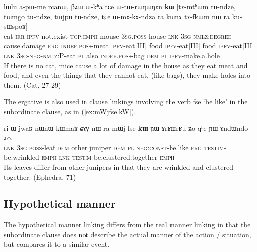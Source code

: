 \documentclass[oldfontcommands,oneside,a4paper,11pt]{article}
\newcommand{\ipa}[1]{{\phon \mbox{#1}}} %
\newcommand{\refb}[1]{(\ref{#1})}
\begin{document}
\begin{exe}
\ex \label{ex:WtWrWNWNAn}
\gll
\ipa{lɯlu}         	\ipa{a-pɯ-me}         	\ipa{rcanɯ,}         	\ipa{βʑɯ}         	\ipa{ɯ-kʰa}         	\ipa{tɕe}         	\ipa{ɯ-tɯ-rɯŋɯŋɤn}         	\ipa{\textbf{kɯ}}          [\ipa{tɤ-mtʰɯm}         	\ipa{tu-ndze,}         	\ipa{tɯmgo}         	\ipa{tu-ndze,}         	\ipa{tɯjpu}         	\ipa{tu-ndze,}         \ipa{tɕe}         	\ipa{ɯ-mɤ-kɤ-ndza}         	\ipa{ra}         	\ipa{kɯnɤ}         	\ipa{tɤ-fkɯm}         	\ipa{nɯ} \ipa{ra}         	\ipa{ku-sɯspoʁ}]         \\
cat \textsc{irr-ipfv}-not.exist \textsc{top:emph} mouse \textsc{3sg.poss}-house \textsc{lnk} \textsc{3sg-nmlz:degree}-cause.damage \textsc{erg} \textsc{indef.poss}-meat \textsc{ipfv}-eat[III] food \textsc{ipfv}-eat[III] food \textsc{ipfv}-eat[III]  \textsc{lnk} \textsc{3sg-neg-nmlz:P}-eat \textsc{pl} also \textsc{indef.poss}-bag \textsc{dem} \textsc{pl} \textsc{ipfv}-make.a.hole \\
\glt  If there is no cat, mice cause a lot of damage in the house as they eat meat and food, and even the things that they cannot eat, (like bags), they make holes into them. (Cat, 27-29)
\end{exe}
 
 
 The ergative is also used in clause linkings involving the verb \ipa{fse} `be like' in the subordinate clause, as in \refb{ex:mWjfse.kW}.
 
 \begin{exe}
\ex \label{ex:mWjfse.kW}
\gll
\ipa{ri} 	\ipa{ɯ-jwaʁ} 	\ipa{nɯnɯ} 	\ipa{kɯmaʁ} 	\ipa{ɕɤɣ} 	\ipa{nɯ} \ipa{ra} 	\ipa{mɯ́j-fse} 	\ipa{\textbf{kɯ}} 	\ipa{ɲɯ-ɤrʁɯrʁu} 	\ipa{ʑo} 	\ipa{qʰe} 	\ipa{ɲɯ-ɤndɯndo} 	\ipa{ʑo.} \\
\textsc{lnk} \textsc{3sg.poss}-leaf \textsc{dem} other juniper \textsc{dem} \textsc{pl} \textsc{neg:const}-be.like \textsc{erg} \textsc{testim}-be.wrinkled \textsc{emph} \textsc{lnk}  \textsc{testim}-be.clustered.together \textsc{emph} \\
\glt Its leaves differ from other junipers in that they are wrinkled and clustered together. (Ephedra, 71)
 \end{exe}
 
\subsection{Hypothetical manner}
The hypothetical manner linking differs from the real manner linking in that the subordinate clause does not describe the actual manner of the action / situation, but compares it to a similar event. 
\end{document}
